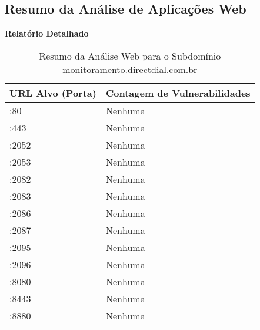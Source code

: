 

\subsection{Resumo da Análise de Aplicações Web}
\textbf{Relatório Detalhado}
\begin{longtable}{|p{3cm}|p{6cm}|}
\caption{Resumo da Análise Web para o Subdomínio monitoramento.directdial.com.br}
\label{tab:web_summary_monitoramento_directdial_com_br} \\
\hline
\textbf{URL Alvo (Porta)} & \textbf{Contagem de Vulnerabilidades} \\ \hline
\endfirsthead
:80 & Nenhuma \\ \hline
:443 & Nenhuma \\ \hline
:2052 & Nenhuma \\ \hline
:2053 & Nenhuma \\ \hline
:2082 & Nenhuma \\ \hline
:2083 & Nenhuma \\ \hline
:2086 & Nenhuma \\ \hline
:2087 & Nenhuma \\ \hline
:2095 & Nenhuma \\ \hline
:2096 & Nenhuma \\ \hline
:8080 & Nenhuma \\ \hline
:8443 & Nenhuma \\ \hline
:8880 & Nenhuma \\ \hline
\end{longtable}
